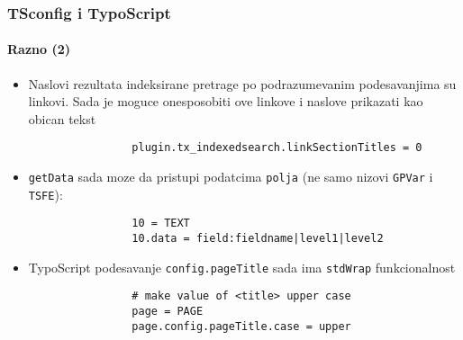 \begin{frame}[fragile]
	\frametitle{TSconfig i TypoScript}
	\framesubtitle{Razno (2)}

	\begin{itemize}

		\item Naslovi rezultata indeksirane pretrage po podrazumevanim podesavanjima su linkovi. 
			Sada je moguce onesposobiti ove linkove i naslove prikazati kao obican tekst

			\begin{lstlisting}
				plugin.tx_indexedsearch.linkSectionTitles = 0
			\end{lstlisting}

		\item \texttt{getData} sada moze da pristupi podatcima \texttt{polja} (ne samo nizovi
			\texttt{GPVar} i \texttt{TSFE}):
		
			\begin{lstlisting}
				10 = TEXT
				10.data = field:fieldname|level1|level2
			\end{lstlisting}

		\item TypoScript podesavanje \texttt{config.pageTitle} sada ima \texttt{stdWrap} funkcionalnost

			\begin{lstlisting}
				# make value of <title> upper case
				page = PAGE
				page.config.pageTitle.case = upper
			\end{lstlisting}

	\end{itemize}

\end{frame}

